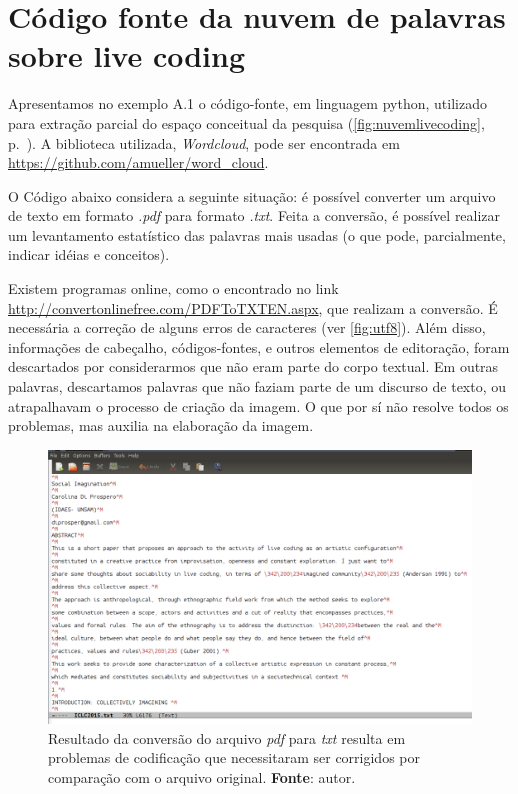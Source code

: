 \chapter{Código fonte da nuvem de palavras sobre live coding}\label{app:C}

Apresentamos no exemplo A.1 o código-fonte, em linguagem python, utilizado para extração parcial do espaço conceitual da pesquisa (\autoref{fig:nuvemlivecoding}, p.~\pageref{fig:nuvemlivecoding}). A biblioteca utilizada, \emph{Wordcloud}, pode ser encontrada em \url{https://github.com/amueller/word_cloud}.

O Código abaixo considera a seguinte situação: é possível converter um arquivo de texto em formato \emph{.pdf} para formato \emph{.txt}. Feita a conversão, é possível realizar um levantamento estatístico das palavras mais usadas (o que pode, parcialmente, indicar idéias e conceitos).

 Existem programas online, como o encontrado no link \url{http://convertonlinefree.com/PDFToTXTEN.aspx}, que realizam a conversão. É necessária a correção de alguns erros de caracteres (ver \autoref{fig:utf8}). Além disso, informações de cabeçalho, códigos-fontes, e outros elementos de editoração, foram descartados por considerarmos que não eram parte do corpo textual. Em outras palavras, descartamos palavras que não faziam parte de um discurso de texto, ou atrapalhavam o processo de criação da imagem. O que por sí não resolve todos os problemas, mas auxilia na elaboração da imagem.

\begin{figure}[!h]
  \centering
  \includegraphics[scale=0.3]{imagens/utf8.png}
  \caption{Resultado da conversão do arquivo \emph{pdf} para \emph{txt} resulta em problemas de codificação que necessitaram ser corrigidos por comparação com o arquivo original. \textbf{Fonte}: autor.}
  \label{fig:utf8}
\end{figure}


